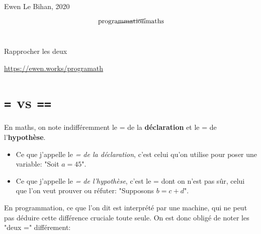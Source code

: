 \documentclass{article}
\begin{document}
\pagestyle{empty}
{\footnotesize Ewen Le Bihan, 2020}

\vfill
{\LARGE
\[
	\text{progra}\cancel{\text{mmation}}\text{maths}
\] \\
}
\begin{center}
	Rapprocher les deux
\end{center}
\vfill
\begin{center}
{\small \url{https://ewen.works/programath} }
\end{center}

\newpage
\pagestyle{plain}
\section{\texttt{=} vs \texttt{==}}
En maths, on note indifféremment le = de la \textbf{déclaration} et le = de l'\textbf{hypothèse}.

\begin{itemize}
	\item Ce que j'appelle le \emph{= de la déclaration}, c'est celui qu'on utilise pour poser une variable: "Soit $a = 45$".
	\item Ce que j'appelle le \emph{= de l'hypothèse}, c'est le = dont on n'est pas sûr, celui que l'on veut prouver ou réfuter: "Supposons $b = c+d$".
\end{itemize}

En programmation, ce que l'on dit est interprété par une machine, qui ne peut pas déduire cette différence cruciale toute seule.
On est donc obligé de noter les "deux =" différement:
\end{document}
